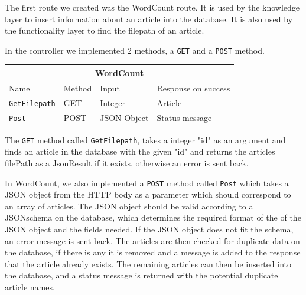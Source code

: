 The first route we created was the WordCount route. It is used by the knowledge layer to insert information about an article into the database. It is also used by the functionality layer to find the filepath of an article.

In the controller we implemented 2 methods, a \texttt{GET} and a \texttt{POST} method.
\begin{table}[h]
    \begin{tabular}{|llll|}
    \hline
    \multicolumn{4}{|c|}{\textbf{WordCount}}                                                                                 \\ \hline
    \multicolumn{1}{|l|}{Name}                 & \multicolumn{1}{l|}{Method} & \multicolumn{1}{l|}{Input}       & Response on success       \\ \hline
    \multicolumn{1}{|l|}{\texttt{GetFilepath}} & \multicolumn{1}{l|}{GET}    & \multicolumn{1}{l|}{Integer}     & Article        \\ \hline
    \multicolumn{1}{|l|}{\texttt{Post}}        & \multicolumn{1}{l|}{POST}   & \multicolumn{1}{l|}{JSON Object} & Status message \\ \hline
    \end{tabular}
    \end{table}

The \texttt{GET} method called \texttt{GetFilepath}, takes a integer "id" as an argument and finds an article in the database with the given "id" and returns the articles filePath as a JsonResult if it exists, otherwise an error is sent back.


In WordCount, we also implemented a \texttt{POST} method called \texttt{Post} which takes a JSON object from the HTTP body as a parameter which should correspond to an array of articles. 
The JSON object should be valid according to a JSONschema on the database, which determines the required format of the of the JSON object and the fields needed. If the JSON object does not fit the schema, an error message is sent back. 
The articles are then checked for duplicate data on the database, if there is any it is removed and a message is added to the response that the article already exists. The remaining articles can then be inserted into the database, and a status message is returned with the potential duplicate article names. 
 
